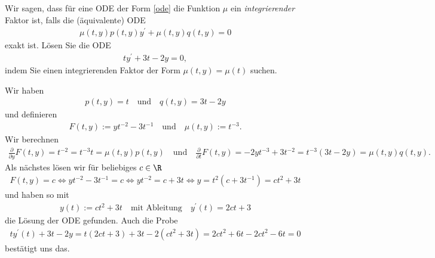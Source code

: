 \begin{exercise}
Wir sagen, dass für eine ODE der Form \eqref{ode} die Funktion $\mu$ ein
\textit{integrierender} Faktor ist, falls die (äquivalente) ODE
\begin{align*}
  \mu(t,y)p(t,y)y^{\prime} + \mu(t,y)q(t,y) = 0
\end{align*}
exakt ist. Lösen Sie die ODE
\begin{align*}
  ty^{\prime} + 3t - 2y = 0,
\end{align*}
indem Sie einen integrierenden Faktor der Form $\mu(t,y) = \mu(t)$ suchen. \\
\end{exercise}
\begin{solution}
  Wir haben
  \begin{align*}
    p(t, y) = t \quad \textrm{und} \quad q(t,y) = 3t - 2y
  \end{align*}
  und definieren
  \begin{align*}
    F(t, y) := yt^{-2} - 3t^{-1} \quad \textrm{und} \quad \mu(t,y) := t^{-3}.
  \end{align*}
  Wir berechnen
  \begin{align*}
    \frac{\partial}{\partial y} F(t, y) = t^{-2} = t^{-3}t = \mu(t, y) p(t, y) \quad \textrm{und} \quad \frac{\partial}{\partial t} F(t, y) = -2yt^{-3} + 3t^{-2} = t^{-3}(3t - 2y) = \mu(t, y) q(t, y).
  \end{align*}
  Als nächstes lösen wir für beliebiges $c \in \R$
  \begin{align*}
    F(t, y) = c \Leftrightarrow yt^{-2} - 3t^{-1} = c \Leftrightarrow yt^{-2} = c + 3t \Leftrightarrow y = t^2 (c + 3t^{-1}) = ct^2 + 3t
  \end{align*}
  und haben so mit
  \begin{align*}
    y(t) := ct^2 + 3t \quad \textrm{mit Ableitung} \quad y^\prime(t) = 2ct + 3
  \end{align*}
  die Lösung der ODE gefunden. Auch die Probe
  \begin{align*}
    ty^\prime(t) + 3t - 2y = t (2ct + 3) + 3t - 2(ct^2 + 3t) = 2ct^2 + 6t - 2ct^2 -6t = 0
  \end{align*}
  bestätigt uns das.
\end{solution}

